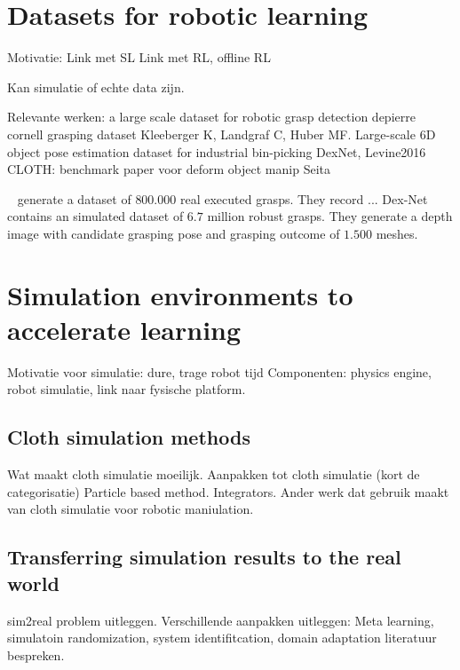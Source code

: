 \documentclass[\home/main.tex]{subfiles}
\begin{document}
\section{Datasets for robotic learning} \label{sec:lit_datasets}
Motivatie:
	Link met SL
	Link met RL, offline RL 

Kan simulatie of echte data zijn. 

Relevante werken:
	a large scale dataset for robotic grasp detection depierre
	cornell grasping dataset
	Kleeberger K, Landgraf C, Huber MF. Large-scale 6D object pose estimation dataset for industrial bin-picking
	DexNet, Levine2016
	CLOTH:
		benchmark paper voor deform object manip Seita 


~\textcite{Levine2016} generate a dataset of $800.000$ real executed grasps. They record ...
Dex-Net~\autocite{dexnet2} contains an simulated dataset of $6.7$ million robust grasps. They generate a depth image with candidate grasping pose and grasping outcome of $1.500$ meshes. 

\section{Simulation environments to accelerate learning} \label{sec:lit_simulation}

Motivatie voor simulatie: dure, trage robot tijd 
Componenten: physics engine, robot simulatie, link naar fysische platform.

\subsection{Cloth simulation methods} \label{subsec:lit_cloth_sim}

Wat maakt cloth simulatie moeilijk. 
Aanpakken tot cloth simulatie (kort de categorisatie)
Particle based method. 
Integrators. 
Ander werk dat gebruik maakt van cloth simulatie voor robotic maniulation.

\subsection{Transferring simulation results to the real world}  \label{sec:lit_sim2real}
sim2real problem uitleggen.
Verschillende aanpakken uitleggen: Meta learning, simulatoin randomization, system identifitcation, domain adaptation
literatuur bespreken. 
\end{document}
